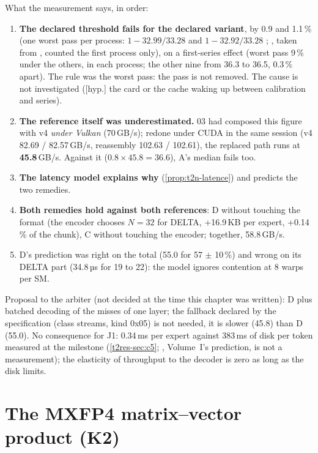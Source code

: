 What the measurement says, in order:
\begin{enumerate}
\item \textbf{The declared threshold fails for the declared variant}, by 0.9 and 1.1\,\% (one worst pass per process: $1 - 32.99/33.28$ and $1 - 32.92/33.28$ \calc; , taken from , counted the first process only), on a first-series effect (worst pass 9\,\% under the others, in each process; the other nine from 36.3 to 36.5, 0.3\,\% apart). The rule was the worst pass: the pass is not removed. The cause is not investigated ([hyp.] the card or the cache waking up between calibration and series).
\item \textbf{The reference itself was underestimated.}  03 had composed this figure with v4 \emph{under Vulkan} (70\,GB/s); redone under CUDA in the same session (v4 82.69 / 82.57\,GB/s, reassembly 102.63 / 102.61), the replaced path runs at \textbf{45.8}\,GB/s. Against it ($0.8 \times 45.8 = 36.6$), A's median fails too.
\item \textbf{The latency model explains why} (\cref{prop:t2n-latence}) and predicts the two remedies.
\item \textbf{Both remedies hold against both references}: D without touching the format (the encoder chooses $N = 32$ for DELTA, +16.9\,KB per expert, +0.14\,\% of the chunk), C without touching the encoder; together, 58.8\,GB/s.
\item D's prediction was right on the total (55.0 for 57 $\pm$ 10\,\%) and wrong on its DELTA part (34.8\,µs for 19 to 22): the model ignores contention at 8 warps per SM.
\end{enumerate}
Proposal to the arbiter (not decided at the time this chapter was written): D plus batched decoding of the misses of one layer; the fallback declared by the specification (class streams, kind 0x05) is not needed, it is slower (45.8) than D (55.0). No consequence for J1: 0.34\,ms per expert against 383\,ms of disk per token measured at the milestone (\cref{t2res-sec:c5}; , Volume~I's prediction, is not a measurement); the elasticity of throughput to the decoder is zero as long as the disk limits.

\section{The MXFP4 matrix--vector product (K2)}\label{sec:t2n-gemv}

